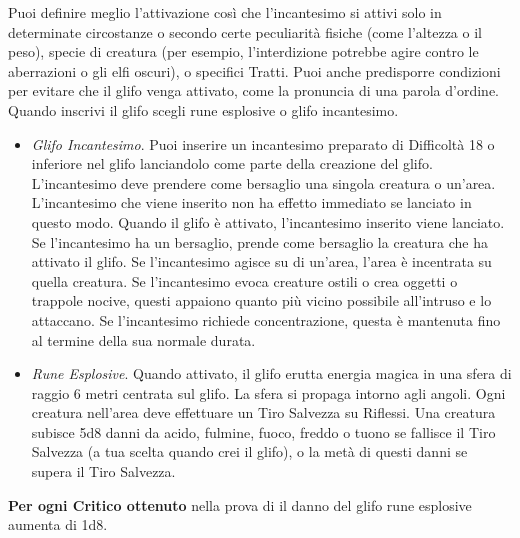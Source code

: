 \begin{multicols}{2}
Puoi definire meglio l'attivazione così che l'incantesimo si attivi solo in determinate circostanze o secondo certe peculiarità fisiche (come l'altezza o il peso), specie di creatura (per esempio, l'interdizione potrebbe agire contro le aberrazioni o gli elfi oscuri), o specifici Tratti. Puoi anche predisporre condizioni per evitare che il glifo venga attivato, come la pronuncia di una parola d'ordine.\\
Quando inscrivi il glifo scegli rune esplosive o glifo incantesimo.
\medskip
\begin{itemize}
\item
\textit{Glifo Incantesimo}. Puoi inserire un incantesimo preparato di Difficoltà 18 o inferiore nel glifo lanciandolo come parte della creazione del glifo. L'incantesimo deve prendere come bersaglio una singola creatura o un'area. L'incantesimo che viene inserito non ha effetto immediato se lanciato in questo modo. Quando il glifo è attivato, l'incantesimo inserito viene lanciato. Se l'incantesimo ha un bersaglio, prende come bersaglio la creatura che ha attivato il glifo. Se l'incantesimo agisce su di un'area, l'area è incentrata su quella creatura. Se l'incantesimo evoca creature ostili o crea oggetti o trappole nocive, questi appaiono quanto più vicino possibile all'intruso e lo attaccano. Se l'incantesimo richiede concentrazione, questa è mantenuta fino al termine della sua normale durata.
\item
\textit{Rune Esplosive}. Quando attivato, il glifo erutta energia magica in una sfera di raggio 6 metri centrata sul glifo. La sfera si propaga intorno agli angoli. Ogni creatura nell'area deve effettuare un Tiro Salvezza su Riflessi. Una creatura subisce 5d8 danni da acido, fulmine, fuoco, freddo o tuono se fallisce il Tiro Salvezza (a tua scelta quando crei il glifo), o la metà di questi danni se supera il Tiro Salvezza.
\end{itemize}
\medskip
\textbf{Per ogni Critico ottenuto} nella prova di il danno del glifo rune esplosive aumenta di 1d8.


\end{multicols}
